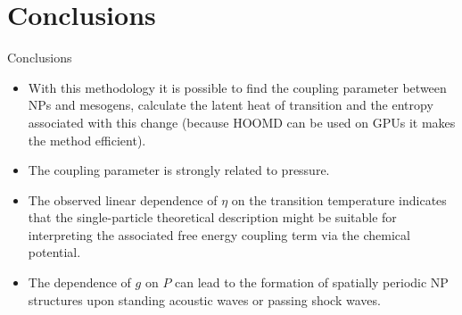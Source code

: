 \documentclass{beamer}
\begin{document}
\section{Conclusions}
\begin{frame}{Conclusions}
    \begin{itemize}
        \item With this methodology it is possible to find the coupling parameter between NPs and mesogens, calculate the latent heat of transition and the entropy associated with this change (because HOOMD can be used on GPUs it makes the method efficient).

        \item The coupling parameter is strongly related to pressure.

        \item The observed linear dependence of $\eta$ on the transition temperature indicates that the single-particle theoretical description might be suitable for interpreting the associated free energy coupling term via the chemical potential.

        \item The dependence of $g$ on $P$ can lead to the formation of spatially periodic NP structures upon standing acoustic waves or passing shock waves.
    \end{itemize}
\end{frame}
\end{document}
